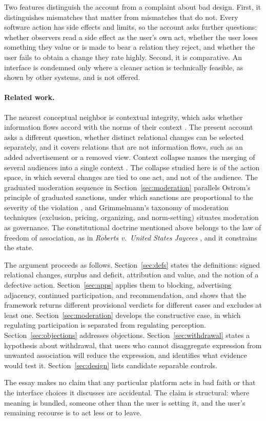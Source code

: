 Two features distinguish the account from a complaint about bad design. First, it distinguishes mismatches that matter from mismatches that do not. Every software action has side effects and limits, so the account asks further questions: whether observers read a side effect as the user's own act, whether the user loses something they value or is made to bear a relation they reject, and whether the user fails to obtain a change they rate highly. Second, it is comparative. An interface is condemned only where a cleaner action is technically feasible, as shown by other systems, and is not offered.

\paragraph{Related work.} The nearest conceptual neighbor is contextual integrity, which asks whether information flows accord with the norms of their context \cite{nissenbaum2004}. The present account asks a different question, whether distinct relational changes can be selected separately, and it covers relations that are not information flows, such as an added advertisement or a removed view. Context collapse names the merging of several audiences into a single context \cite{marwick-boyd2011}. The collapse studied here is of the action space, in which several changes are tied to one act, and not of the audience. The graduated moderation sequence in Section~\ref{sec:moderation} parallels Ostrom's principle of graduated sanctions, under which sanctions are proportional to the severity of the violation \cite{ostrom1990}, and Grimmelmann's taxonomy of moderation techniques (exclusion, pricing, organizing, and norm-setting) \cite{grimmelmann2015} situates moderation as governance. The constitutional doctrine mentioned above belongs to the law of freedom of association, as in \emph{Roberts v.\ United States Jaycees} \cite{roberts1984}, and it constrains the state.

The argument proceeds as follows. Section~\ref{sec:defs} states the definitions: signed relational changes, surplus and deficit, attribution and value, and the notion of a defective action. Section~\ref{sec:apps} applies them to blocking, advertising adjacency, continued participation, and recommendation, and shows that the framework returns different provisional verdicts for different cases and excludes at least one. Section~\ref{sec:moderation} develops the constructive case, in which regulating participation is separated from regulating perception. Section~\ref{sec:objections} addresses objections. Section~\ref{sec:withdrawal} states a hypothesis about withdrawal, that users who cannot disaggregate expression from unwanted association will reduce the expression, and identifies what evidence would test it. Section~\ref{sec:design} lists candidate separable controls.

The essay makes no claim that any particular platform acts in bad faith or that the interface choices it discusses are accidental. The claim is structural: where meaning is bundled, someone other than the user is setting it, and the user's remaining recourse is to act less or to leave.
